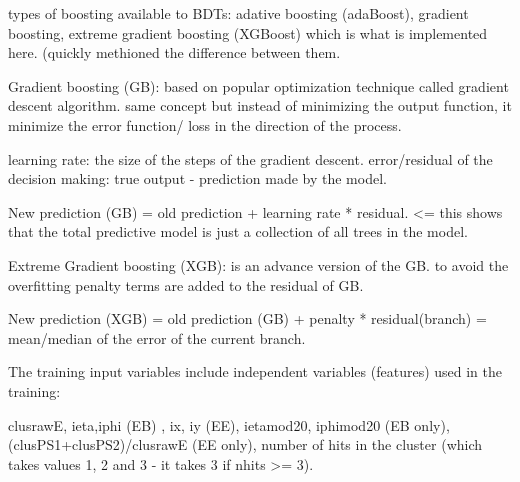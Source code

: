 types of boosting available to BDTs: adative boosting (adaBoost), gradient boosting, extreme gradient boosting (XGBoost) which is what is implemented here. 
(quickly methioned the difference between them.


Gradient boosting (GB): based on popular optimization technique called gradient descent algorithm.
same concept but instead of minimizing the output function, it minimize the error function/ loss in the direction of the process.

learning rate: the size of the steps of the gradient descent.
error/residual of the decision making: true output - prediction made by the model.

New prediction (GB)  = old prediction + learning rate * residual. <= this shows that the total predictive model is just a collection of all trees in the model.

Extreme Gradient boosting (XGB): is an advance version of the GB. to avoid the overfitting penalty terms are added to the residual of GB.

New prediction (XGB) = old prediction (GB) + penalty * residual(branch) = mean/median of the error of the current branch.



The training input variables include independent variables (features) used in the training:

clusrawE,
ieta,iphi (EB) ,
ix, iy (EE),
ietamod20, iphimod20 (EB only),
(clusPS1+clusPS2)/clusrawE (EE only),
number of hits in the cluster (which takes values 1, 2 and 3 - it takes 3 if nhits >= 3).

